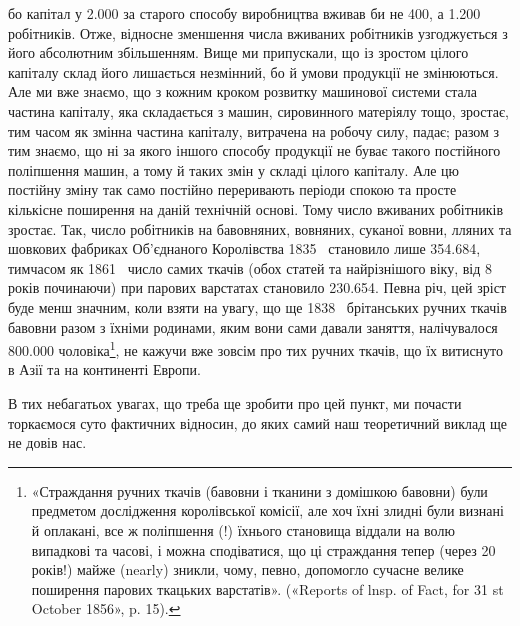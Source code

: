 \parcont{}  %
бо капітал у \num{2.000} за старого способу виробництва
вживав би не 400, а \num{1.200} робітників. Отже, відносне зменшення
числа вживаних робітників узгоджується з його абсолютним
збільшенням. Вище ми припускали, що із зростом цілого
капіталу склад його лишається незмінний, бо й умови продукції
не змінюються. Але ми вже знаємо, що з кожним кроком розвитку
машинової системи стала частина капіталу, яка складається з
машин, сировинного матеріялу тощо, зростає, тим часом як
змінна частина капіталу, витрачена на робочу силу, падає; разом
з тим знаємо, що ні за якого іншого способу продукції не буває
такого постійного поліпшення машин, а тому й таких змін у
складі цілого капіталу. Але цю постійну зміну так само постійно
переривають періоди спокою та просте кількісне поширення на
даній технічній основі. Тому число вживаних робітників зростає.
Так, число робітників на бавовняних, вовняних, суканої вовни,
лляних та шовкових фабриках Об’єднаного Королівства 1835~
становило лише \num{354.684}, тимчасом як 1861~ число самих ткачів
(обох статей та найрізнішого віку, від 8 років починаючи) при
парових варстатах становило \num{230.654}. Певна річ, цей зріст буде
менш значним, коли взяти на увагу, що ще 1838~ брітанських
ручних ткачів бавовни разом з їхніми родинами, яким вони сами
давали заняття, налічувалося \num{800.000} чоловіка\footnote{
«Страждання ручних ткачів (бавовни і тканини з домішкою
бавовни) були предметом дослідження королівської комісії, але хоч їхні
злидні були визнані й оплакані, все ж поліпшення (!) їхнього становища
віддали на волю випадкові та часові, і можна сподіватися, що ці страждання
тепер (через 20 років!) майже (nearly) зникли, чому, певно, допомогло
сучасне велике поширення парових ткацьких варстатів». («Reports
of lnsp. of Fact, for 31 st October 1856», p. 15).
}, не кажучи вже
зовсім про тих ручних ткачів, що їх витиснуто в Азії та на континенті
Европи.

В тих небагатьох увагах, що треба ще зробити про цей пункт,
ми почасти торкаємося суто фактичних відносин, до яких самий
наш теоретичний виклад ще не довів нас.

